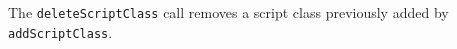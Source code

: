 The \verb+deleteScriptClass+ call removes a script class previously added by \verb+addScriptClass+.
